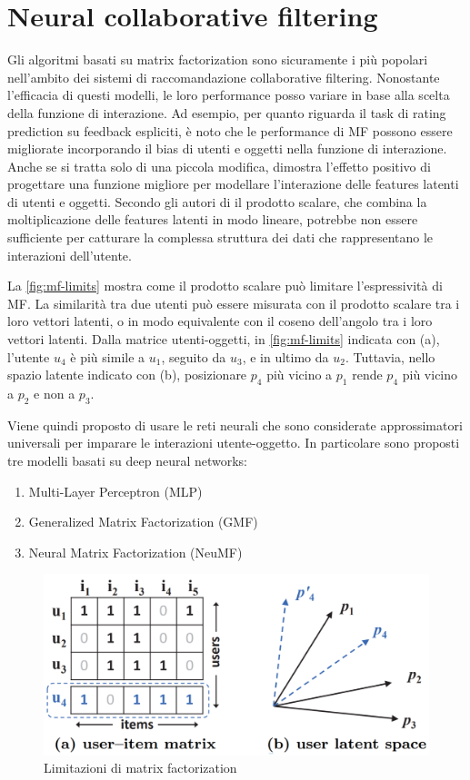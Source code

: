 \documentclass[12pt,italian]{report}
\begin{document}
\section{Neural collaborative filtering} \label{sec:ncf}
Gli algoritmi basati su matrix factorization sono sicuramente i più popolari nell'ambito dei sistemi di raccomandazione collaborative filtering. Nonostante l'efficacia di questi modelli, le loro performance  posso variare in base alla scelta della funzione di interazione. Ad esempio, per quanto riguarda il task di rating prediction su feedback espliciti, è noto che le performance di MF possono essere migliorate incorporando il bias di utenti e oggetti nella funzione di interazione. Anche se si tratta solo di una piccola modifica, dimostra l'effetto positivo di progettare una funzione migliore per modellare l'interazione delle features latenti di utenti e oggetti. 
Secondo gli autori di \cite{NCF} il prodotto scalare, che combina la moltiplicazione delle features latenti in modo lineare, potrebbe non essere sufficiente per catturare la complessa struttura dei dati che rappresentano le interazioni dell'utente. 

La \autoref{fig:mf-limits} mostra come il prodotto scalare può limitare l'espressività di MF. La similarità tra due utenti può essere misurata con il prodotto scalare tra i loro vettori latenti, o in modo equivalente con il coseno dell'angolo tra i loro vettori latenti. Dalla matrice utenti-oggetti, in \autoref{fig:mf-limits} indicata con (a), l'utente $u_4$ è più simile a $u_1$, seguito da $u_3$, e in ultimo da $u_2$. Tuttavia, nello spazio latente indicato con (b), posizionare $p_4$ più vicino a $p_1$ rende $p_4$ più vicino a $p_2$ e non a $p_3$.

Viene quindi proposto di usare le reti neurali che sono considerate approssimatori universali \cite{NN-universal-approx} per imparare le interazioni utente-oggetto. In particolare sono proposti tre modelli basati su deep neural networks:
\begin{enumerate}
 \item Multi-Layer Perceptron (MLP)
 \item Generalized Matrix Factorization (GMF)
 \item Neural Matrix Factorization (NeuMF)
\end{enumerate}

\begin{figure}
  \includegraphics[width=\linewidth]{immagini/user_item_vectors.png}
  \caption{Limitazioni di matrix factorization}
  \label{fig:mf-limits}
\end{figure}
\end{document}
